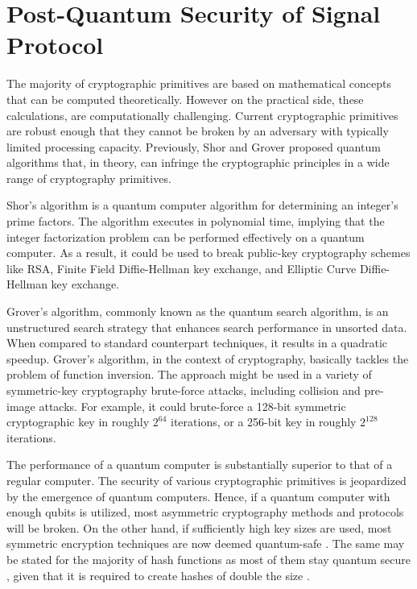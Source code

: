 \section{Post-Quantum Security of Signal Protocol}
The majority of cryptographic primitives are based on mathematical concepts that can be computed theoretically. However on the practical side, these calculations, are computationally challenging. Current cryptographic primitives are robust enough that they cannot be broken by an adversary with typically limited processing capacity. Previously, Shor \cite{shor94} and Grover \cite{gro96} proposed quantum algorithms that, in theory, can infringe the cryptographic principles in a wide range of cryptography primitives.
\par
Shor's algorithm is a quantum computer algorithm for determining an integer's prime factors. The algorithm executes in polynomial time, implying that the integer factorization problem can be performed effectively on a quantum computer. As a result, it could be used to break public-key cryptography schemes like RSA, Finite Field Diffie-Hellman key exchange, and Elliptic Curve Diffie-Hellman key exchange.
\par
Grover's algorithm, commonly known as the quantum search algorithm, is an unstructured search strategy that enhances search performance in unsorted data. When compared to standard counterpart techniques, it results in a quadratic speedup. Grover's algorithm, in the context of cryptography, basically tackles the problem of function inversion. The approach might be used in a variety of symmetric-key cryptography brute-force attacks, including collision and pre-image attacks. For example, it could brute-force a 128-bit symmetric cryptographic key in roughly $ 2^{64} $ iterations, or a 256-bit key in roughly $ 2^{128} $ iterations.
\par
The performance of a quantum computer is substantially superior to that of a regular computer. The security of various cryptographic primitives is jeopardized by the emergence of quantum computers. Hence, if a quantum computer with enough qubits is utilized, most asymmetric cryptography methods and protocols will be broken. On the other hand, if sufficiently high key sizes are used, most symmetric encryption techniques are now deemed quantum-safe \cite{essay77239}. The same may be stated for the majority of hash functions as most of them stay quantum secure \cite{ber09}, given that it is required to create hashes of double the size \cite{bra+98}.
\par
